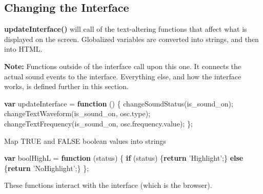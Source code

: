 \documentclass[]{article}
\newenvironment{Shaded}{}{}
\newcommand{\KeywordTok}[1]{\textcolor[rgb]{0.00,0.44,0.13}{\textbf{#1}}}
\newcommand{\StringTok}[1]{\textcolor[rgb]{0.25,0.44,0.63}{#1}}
\newcommand{\VariableTok}[1]{\textcolor[rgb]{0.10,0.09,0.49}{#1}}
\newcommand{\ControlFlowTok}[1]{\textcolor[rgb]{0.00,0.44,0.13}{\textbf{#1}}}
\newcommand{\OperatorTok}[1]{\textcolor[rgb]{0.40,0.40,0.40}{#1}}
\newcommand{\AttributeTok}[1]{\textcolor[rgb]{0.49,0.56,0.16}{#1}}
\newcommand{\NormalTok}[1]{#1}
\begin{document}
\subsection{Changing the Interface}\label{changing-the-interface}

\textbf{updateInterface()} will call of the text-altering functions that
affect what is displayed on the screen. Globalized variables are
converted into strings, and then into HTML.

\textbf{Note:} Functions outside of the interface call upon this one. It
connects the actual sound events to the interface. Everything else, and
how the interface works, is defined further in this section.

\begin{Shaded}
\begin{Highlighting}[]
\KeywordTok{var}\NormalTok{ updateInterface }\OperatorTok{=} \KeywordTok{function}\NormalTok{ () }\OperatorTok{\{}
    \AttributeTok{changeSoundStatus}\NormalTok{(is_sound_on)}\OperatorTok{;}
    \AttributeTok{changeTextWaveform}\NormalTok{(is_sound_on}\OperatorTok{,} \VariableTok{osc}\NormalTok{.}\AttributeTok{type}\NormalTok{)}\OperatorTok{;}
    \AttributeTok{changeTextFrequency}\NormalTok{(is_sound_on}\OperatorTok{,} \VariableTok{osc}\NormalTok{.}\VariableTok{frequency}\NormalTok{.}\AttributeTok{value}\NormalTok{)}\OperatorTok{;}
\OperatorTok{\};}
\end{Highlighting}
\end{Shaded}

Map TRUE and FALSE boolean values into strings

\begin{Shaded}
\begin{Highlighting}[]
\KeywordTok{var}\NormalTok{ boolHighL }\OperatorTok{=} \KeywordTok{function}\NormalTok{ (status) }\OperatorTok{\{}
    \ControlFlowTok{if}\NormalTok{ (status) }\OperatorTok{\{}\ControlFlowTok{return} \StringTok{'Highlight'}\OperatorTok{;\}} 
    \ControlFlowTok{else}        \OperatorTok{\{}\ControlFlowTok{return} \StringTok{'NoHighlight'}\OperatorTok{;\}}
\OperatorTok{\};}
\end{Highlighting}
\end{Shaded}

These functions interact with the interface (which is the browser).
\end{document}

